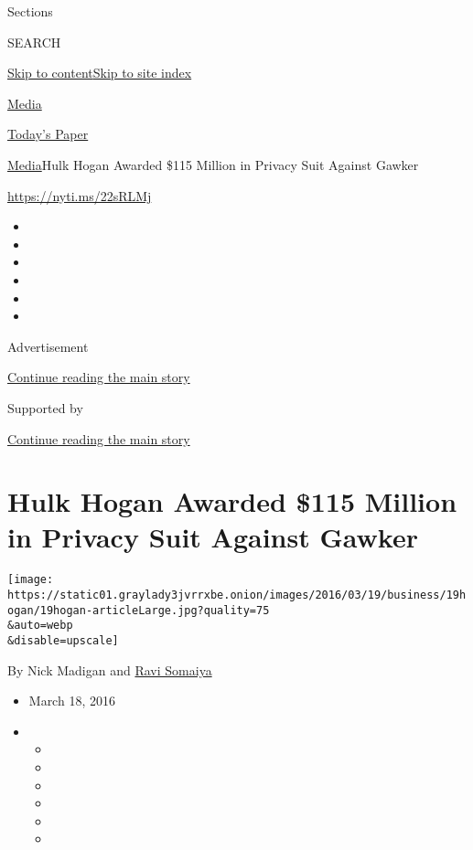 Sections

SEARCH

\protect\hyperlink{site-content}{Skip to
content}\protect\hyperlink{site-index}{Skip to site index}

\href{https://www.nytimes3xbfgragh.onion/pages/business/media/index.html}{Media}

\href{https://myaccount.nytimes3xbfgragh.onion/auth/login?response_type=cookie\&client_id=vi}{}

\href{https://www.nytimes3xbfgragh.onion/section/todayspaper}{Today's
Paper}

\href{/pages/business/media/index.html}{Media}\textbar{}Hulk Hogan
Awarded \$115 Million in Privacy Suit Against Gawker

\url{https://nyti.ms/22sRLMj}

\begin{itemize}
\item
\item
\item
\item
\item
\item
\end{itemize}

Advertisement

\protect\hyperlink{after-top}{Continue reading the main story}

Supported by

\protect\hyperlink{after-sponsor}{Continue reading the main story}

\hypertarget{hulk-hogan-awarded-115-million-in-privacy-suit-against-gawker}{%
\section{Hulk Hogan Awarded \$115 Million in Privacy Suit Against
Gawker}\label{hulk-hogan-awarded-115-million-in-privacy-suit-against-gawker}}

\texttt{[image: https://static01.graylady3jvrrxbe.onion/images/2016/03/19/business/19hogan/19hogan-articleLarge.jpg?quality=75\\\&auto=webp\\\&disable=upscale]}

By Nick Madigan and
\href{http://www.nytimes3xbfgragh.onion/by/ravi-somaiya}{Ravi Somaiya}

\begin{itemize}
\item
  March 18, 2016
\item
  \begin{itemize}
  \item
  \item
  \item
  \item
  \item
  \item
  \end{itemize}
\end{itemize}

